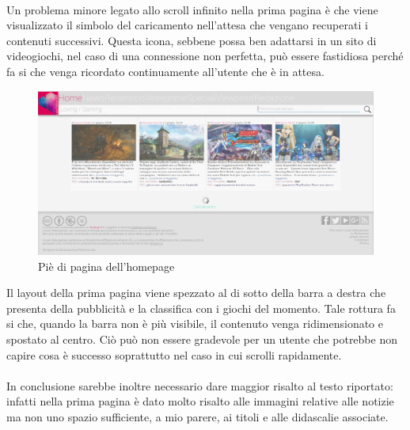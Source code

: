 \documentclass[../ProgettoTecWeb2.tex]{subfiles}
\begin{document}
		\paragraph{}
		Un problema minore legato allo scroll infinito nella prima pagina è che viene visualizzato il simbolo del caricamento nell'attesa che vengano recuperati i contenuti successivi. Questa icona, sebbene possa ben adattarsi in un sito di videogiochi, nel caso di una connessione non perfetta, può essere fastidiosa perché fa si che venga ricordato continuamente all'utente che è in attesa.
		\begin{figure} [H]
			\centering
			\includegraphics[scale=0.3]{img/PieDiPaginaHomepage}
			\caption{Piè di pagina dell'homepage}
		\end{figure}

		Il layout della prima pagina viene spezzato al di sotto della barra a destra che presenta della pubblicità e la classifica con i giochi del momento. Tale rottura fa si che, quando la barra non è più visibile, il contenuto venga ridimensionato e spostato al centro. Ciò può non essere gradevole per un utente che potrebbe non capire cosa è successo soprattutto nel caso in cui scrolli rapidamente. 

		\paragraph{}
		In conclusione sarebbe inoltre necessario dare maggior risalto al testo riportato: infatti nella prima pagina è dato molto risalto alle immagini relative alle notizie ma non uno spazio sufficiente, a mio parere, ai titoli e alle didascalie associate.
\end{document}
